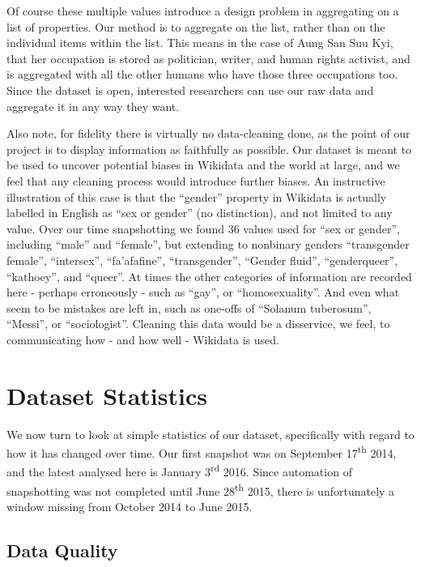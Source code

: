 \documentclass[letterpaper]{article}
\begin{document}
Of course these multiple values introduce a design problem in aggregating on a list of properties. Our method is to aggregate on the list, rather than on the individual items within the list. This means in the case of Aung San Suu Kyi, that her occupation is stored as politician, writer, and human rights activist, and is aggregated with all the other humans who have those three occupations too. Since the dataset is open, interested researchers can use our raw data and aggregate it in any way they want.

Also note, for fidelity there is virtually no data-cleaning done, as the point of our project is to display information as faithfully as possible. Our dataset is meant to be used to uncover potential biases in Wikidata and the world at large, and we feel that any cleaning process would introduce further biases. An instructive illustration of this case is that the ``gender'' property in Wikidata is actually labelled in English  as ``sex or gender'' (no distinction), and not limited to any value. Over our time snapshotting we found 36 values used for ``sex or gender'', including ``male'' and ``female'', but extending to nonbinary genders ``transgender female'', ``intersex'', ``fa'afafine'', ``transgender'', ``Gender fluid'',  ``genderqueer'', ``kathoey'', and ``queer''. At times the other categories of information are recorded here - perhaps erroneously - such as ``gay'', or ``homosexuality''. And even what seem to be mistakes are left in, such as one-offs of ``Solanum tuberosum'', ``Messi'', or ``sociologist''. Cleaning this data would be a disservice, we feel, to communicating how - and how well - Wikidata is used.

\section{Dataset Statistics}
We now turn to look at simple statistics of our dataset, specifically with regard to how it has changed over time. Our first snapshot was on September 17\textsuperscript{th} 2014, and the latest analysed here is January 3\textsuperscript{rd} 2016. Since automation of snapshotting was not completed until June 28\textsuperscript{th} 2015, there is unfortunately a window missing from October 2014 to June 2015. 

\subsection{Data Quality}
\end{document}
